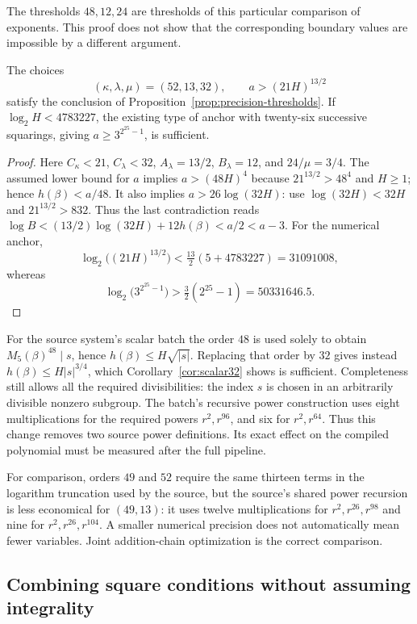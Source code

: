 The thresholds $48,12,24$ are thresholds of this particular comparison
of exponents. This proof does not show that the corresponding boundary
values are impossible by a different argument.

\begin{corollary}\label{cor:scalar32}
The choices
\[
 (\kappa,\lambda,\mu)=(52,13,32),\qquad a>(21H)^{13/2}
\]
satisfy the conclusion of Proposition~\ref{prop:precision-thresholds}.
If $\log_2H<4783227$, the existing type of anchor with twenty-six
successive squarings, giving $a\ge3^{2^{25}-1}$, is sufficient.
\end{corollary}
\begin{proof}
Here $C_\kappa<21$, $C_\lambda<32$,
$A_\lambda=13/2$, $B_\lambda=12$, and $24/\mu=3/4$.
The assumed lower bound for $a$ implies $a>(48H)^4$ because
$21^{13/2}>48^4$ and $H\ge1$; hence $h(\beta)<a/48$.
It also implies $a>26\log(32H)$: use $\log(32H)<32H$ and
$21^{13/2}>832$. Thus the last contradiction reads
$\log B<(13/2)\log(32H)+12h(\beta)<a/2<a-3$.
For the numerical anchor,
\[
 \log_2\big((21H)^{13/2}\big)
 <\tfrac{13}{2}(5+4783227)=31091008,
\]
whereas
\[
 \log_2\big(3^{2^{25}-1}\big)
 >\tfrac32(2^{25}-1)=50331646.5.
\]
\end{proof}

For the source system's scalar batch the order $48$ is used solely to
obtain $M_5(\beta)^{48}\mid s$, hence
$h(\beta)\le H\sqrt{|s|}$. Replacing that order by $32$ gives instead
$h(\beta)\le H|s|^{3/4}$, which Corollary~\ref{cor:scalar32} shows
is sufficient. Completeness still allows all the required divisibilities:
the index $s$ is chosen in an arbitrarily divisible nonzero subgroup.
The batch's recursive power construction uses eight multiplications
for the required powers $r^2,r^{96}$, and six for $r^2,r^{64}$.
Thus this change removes two source power definitions. Its exact effect
on the compiled polynomial must be measured after the full pipeline.

For comparison, orders $49$ and $52$ require the same thirteen terms
in the logarithm truncation used by the source, but the source's shared
power recursion is less economical for $(49,13)$: it uses twelve
multiplications for $r^2,r^{26},r^{98}$ and nine for
$r^2,r^{26},r^{104}$. A smaller numerical precision does not automatically
mean fewer variables. Joint addition-chain optimization is the correct
comparison.

\subsection{Combining square conditions without assuming integrality}

